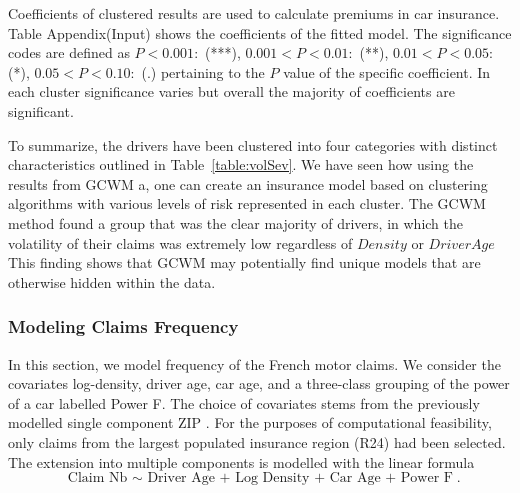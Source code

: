 \documentclass[11pt,letterpaper]{article}
\numberwithin{equation}{section}
\numberwithin{equation}{section}
\numberwithin{equation}{section}
\begin{document}
Coefficients of clustered results are used to calculate premiums in car insurance. Table Appendix(Input) shows the coefficients of the fitted model. The significance codes are defined as $  P < 0.001 : $  (***), $0.001 < P < 0.01:$ (**), $  0.01 < P < 0.05:$ (*), $0.05 < P < 0.10 : $ (.) %
pertaining to the $P$ value of the specific coefficient. In each cluster significance varies but overall the majority of coefficients are significant.

To summarize, the drivers have been clustered into four categories with distinct characteristics outlined in Table~\ref{table:volSev}. We have seen how using the results from GCWM a, one can create an insurance model based on clustering algorithms with various levels of risk represented in each cluster. The GCWM method found a group that was the clear majority of drivers, in which the volatility of their claims was extremely low regardless of $Density$ or $DriverAge$ This finding shows that GCWM may potentially find unique models that are otherwise hidden within the data.


 \subsubsection{Modeling Claims Frequency}

In this section, we model frequency of the French motor claims. We consider the covariates log-density, driver age, car age, and a three-class grouping of the power of a car labelled Power F. The choice of covariates stems from the previously modelled single component ZIP \citep{Charpentier:2014}. For the purposes of computational feasibility, only claims from the largest populated insurance region (R24) had been selected. %
The extension into multiple components is modelled with the linear formula
$$ \text{ Claim Nb $\sim$  Driver Age + Log Density + Car Age + Power F}. $$%
\end{document}
